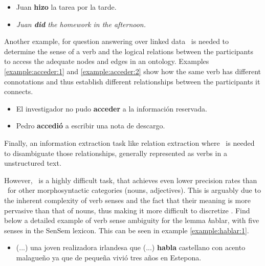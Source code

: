 \begin{example}\label{example:hacer:2}
  \begin{itemize}
    \item Juan {\bf hizo} la tarea por la tarde.
    \item {\em Juan {\bf did} the homework in the afternoon.}
  \end{itemize}
\end{example}

Another example, for question answering over linked data \vsd~is needed to
determine the sense of a verb and the logical relations between the
participants to access the adequate nodes and edges in an ontology. Examples
\ref{example:acceder:1} and \ref{example:acceder:2} show how the same verb has
different connotations and thus establish different relationships between the
participants it connects.

\begin{example}\label{example:acceder:1}
  \begin{itemize}
    \item El investigador no pudo {\bf acceder} a la informaci\'on reservada.
  \end{itemize}
\end{example}

\begin{example}\label{example:acceder:2}
  \begin{itemize}
    \item Pedro {\bf accedi\'o} a escribir una nota de descargo.
  \end{itemize}
\end{example}

Finally, an information extraction task like relation extraction where \vsd~is
needed to disambiguate those relationships, generally represented as verbs in a
unstructured text.

However, \vsd~is a highly difficult task, that achieves even lower precision
rates than \wsd~for other morphosyntactic categories (nouns, adjectives). This
is arguably due to the inherent complexity of verb senses and the fact that
their meaning is more pervasive than that of nouns, thus making it more
difficult to discretize \cite{chen2009improving}.  Find below a detailed
example of verb sense ambiguity for the lemma {\emph hablar}, with five senses
in the SenSem lexicon. This can be seen in example \ref{example:hablar:1}.

\begin{example}\label{example:hablar:1}
  \begin{itemize}
    \item (...) una joven realizadora irlandesa que (...) {\bf habla}
      castellano con acento malague\~no ya que de peque\~na vivi\'o tres a\~nos
      en Estepona.
  \end{itemize}
\end{example}

